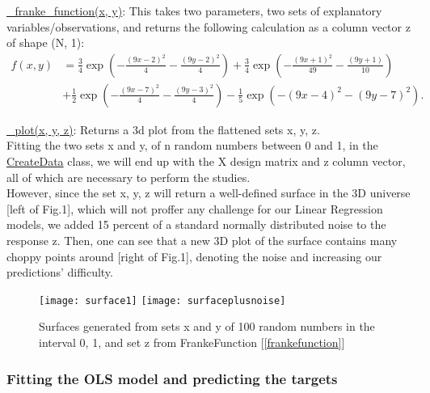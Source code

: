 \href{https://github.com/fabiorodp/UiO-FYS-STK4155/blob/master/Project1/package/Create_data.py}{\_franke\_function(x, y)}: This takes two parameters, two sets of explanatory variables/observations, and returns the following calculation as a column vector z of shape (N, 1):\\

\label{frankefunction}
\begin{align*}
f(x, y) &= \frac{3}{4}\exp{\left(-\frac{(9x-2)^2}{4} - \frac{(9y-2)^2}{4}\right)} + \frac{3}{4}\exp{\left( - \frac{(9x+1)^2}{49} - \frac{(9y+1)}{10}\right)}\\ &+ \frac{1}{2}\exp{\left( - \frac{(9x-7)^2}{4} - \frac{(9y-3)^2}{4}\right)} - \frac{1}{5}\exp{\left( - (9x-4)^2 - (9y - 7)^2\right)}.
\end{align*}

\href{https://github.com/fabiorodp/UiO-FYS-STK4155/blob/master/Project1/package/Create_data.py}{\_plot(x, y, z)}:  Returns a 3d plot from the flattened sets x, y, z.\\

Fitting the two sets x and y, of n random numbers between 0 and 1, in the \href{https://github.com/fabiorodp/UiO-FYS-STK4155/blob/master/Project1/package/Create_data.py}{CreateData} class, we will end up with the X design matrix and z column vector, all of which are necessary to perform the studies.\\

However, since the set x, y, z will return a well-defined surface in the 3D universe [left of Fig.1], which will not proffer any challenge for our Linear Regression models, we added 15 percent of a standard normally distributed noise to the response z. Then, one can see that a new 3D plot of the surface contains many choppy points around [right of Fig.1], denoting the noise and increasing our predictions' difficulty.\\

\begin{figure}[H]
\label{fig:surface}
\centering
\texttt{[image: surface1]}
\texttt{[image: surfaceplusnoise]}
\caption{Surfaces generated from sets x and y of 100 random numbers in the interval 0, 1, and set z from FrankeFunction [\ref{frankefunction}]}
\end{figure}

\subsubsection{Fitting the OLS model and predicting the targets}
\label{chap:Fitting the OLS model and predicting the targets}


